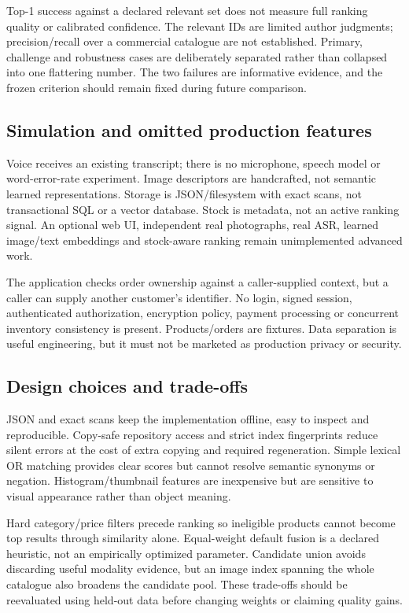 \documentclass[11pt,a4paper]{article}
\begin{document}
Top-1 success against a declared relevant set does not measure full ranking quality or calibrated confidence. The relevant IDs are limited author judgments; precision/recall over a commercial catalogue are not established. Primary, challenge and robustness cases are deliberately separated rather than collapsed into one flattering number. The two failures are informative evidence, and the frozen criterion should remain fixed during future comparison.

\subsection{Simulation and omitted production features}
Voice receives an existing transcript; there is no microphone, speech model or word-error-rate experiment. Image descriptors are handcrafted, not semantic learned representations. Storage is JSON/filesystem with exact scans, not transactional SQL or a vector database. Stock is metadata, not an active ranking signal. An optional web UI, independent real photographs, real ASR, learned image/text embeddings and stock-aware ranking remain unimplemented advanced work.

The application checks order ownership against a caller-supplied context, but a caller can supply another customer's identifier. No login, signed session, authenticated authorization, encryption policy, payment processing or concurrent inventory consistency is present. Products/orders are fixtures. Data separation is useful engineering, but it must not be marketed as production privacy or security.

\subsection{Design choices and trade-offs}
JSON and exact scans keep the implementation offline, easy to inspect and reproducible. Copy-safe repository access and strict index fingerprints reduce silent errors at the cost of extra copying and required regeneration. Simple lexical OR matching provides clear scores but cannot resolve semantic synonyms or negation. Histogram/thumbnail features are inexpensive but are sensitive to visual appearance rather than object meaning.

Hard category/price filters precede ranking so ineligible products cannot become top results through similarity alone. Equal-weight default fusion is a declared heuristic, not an empirically optimized parameter. Candidate union avoids discarding useful modality evidence, but an image index spanning the whole catalogue also broadens the candidate pool. These trade-offs should be reevaluated using held-out data before changing weights or claiming quality gains.
\end{document}
